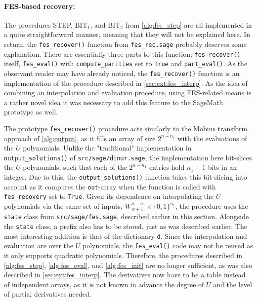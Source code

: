 \paragraph{FES-based recovery:} The procedures STEP, $\text{BIT}_1$, and $\text{BIT}_2$ from \cref{alg:fes_step} are all implemented in a quite straightforward manner, meaning that they will not be explained here. In return, the \texttt{fes\_recover()} function from \texttt{fes\_rec.sage} probably deserves some explanation. There are essentially three parts to this function; \texttt{fes\_recover()} itself, \texttt{fes\_eval()} with \texttt{compute\_parities} set to \texttt{True} and \texttt{part\_eval()}. As the observant reader may have already noticed, the \texttt{fes\_recover()} function is an implementation of the procedure described in \cref{sec:ext:fes_interp}. As the idea of combining an interpolation and evaluation procedure, using FES-related means is a rather novel idea it was necessary to add this feature to the SageMath prototype as well. 

The prototype \texttt{fes\_recover()} procedure acts similarly to the Möbius transform approach of \cref{alg:output}, as it fills an array of size $2^{n - n_1}$ with the evaluations of the $U$ polynomials. Unlike the "traditional" implementation in \texttt{output\_solutions()} of \texttt{src/sage/dinur.sage}, the implementation here bit-slices the $U$ polynomials, such that each of the $2^{n - n_1}$ entries hold $n_1 + 1$ bits in an integer. Due to this, the \texttt{output\_solutions()} function takes this bit-slicing into account as it computes the \texttt{out}-array when the function is called with \texttt{fes\_recovery} set to \texttt{True}.
Given its dependence on interpolating the $U$ polynomials via the same set of inputs, $W^{n - n_1}_{w + 1} \times \{0,1\}^{n_1}$, the procedure uses the \texttt{state} class from \texttt{src/sage/fes.sage}, described earlier in this section. Alongside the \texttt{state} class, a prefix also has to be stored, just as was described earlier. The most interesting addition is that of the dictionary \texttt{d}. Since the interpolation and evaluation are over the $U$ polynomials, the \texttt{fes\_eval()} code may not be reused as it only supports quadratic polynomials. Therefore, the procedures described in \cref{alg:fes_step}, \cref{alg:fes_eval}, and \cref{alg:fes_init} are no longer sufficient, as was also described in \cref{sec:ext:fes_interp}. The derivatives now have to be a table instead of independent arrays, as it is not known in advance the degree of $U$ and the level of partial derivatives needed.

